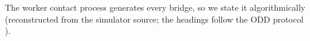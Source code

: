 The worker contact process generates every bridge, so we state it algorithmically
(reconstructed from the simulator source; the headings follow the ODD protocol
\citep{grimm2020}).
